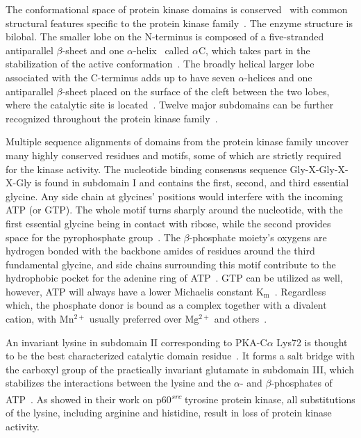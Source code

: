   The conformational space of protein kinase domains is conserved~\cite{ung2018redefining}
  with common structural features specific to the protein kinase
  family~\cite{taylor1994three}.
  The enzyme structure is bilobal.
  The smaller lobe on the N-terminus is composed of a five-stranded antiparallel
  $\beta$-sheet and one $\alpha$-helix~\cite{knighton1991crystal} called $\alpha$C, which
  takes part in the stabilization of the active
  conformation~\cite{mobitz2015abc, huse2002conformational}.
  The broadly helical larger lobe associated with the C-terminus adds up to have seven
  $\alpha$-helices and one antiparallel $\beta$-sheet placed on the surface of the cleft
  between the two lobes, where the catalytic site is
  located~\cite{knighton1991crystal, taylor1994three, azam2008activation}.
  Twelve major subdomains can be further recognized throughout the protein kinase
  family~\cite{hanks1988protein, hanks19912, hanks1995eukaryotic}.

  Multiple sequence alignments of domains from the protein kinase family uncover many
  highly conserved residues and motifs, some of which are strictly required for the kinase
  activity.
  The nucleotide binding consensus sequence Gly-X-Gly-X-X-Gly is found in subdomain I and
  contains the first, second, and third essential glycine.
  Any side chain at glycines' positions would interfere with the incoming ATP (or GTP).
  The whole motif turns sharply around the nucleotide, with the first essential glycine
  being in contact with ribose, while the second provides space for the pyrophosphate
  group~\cite{wierenga1983predicted, hanks1988protein}.
  The $\beta$-phosphate moiety's oxygens are hydrogen bonded with the backbone amides of
  residues around the third fundamental glycine, and side chains surrounding this motif
  contribute to the hydrophobic pocket for the adenine ring of
  ATP~\cite{hanks1995eukaryotic}.
  GTP can be utilized as well, however, ATP will always have a lower Michaelis constant
  $\mathrm{K_{m}}$~\cite{hunter1985protein}.
  Regardless which, the phosphate donor is bound as a complex together with a divalent
  cation, with $\mathrm{Mn^{2+}}$ usually preferred over $\mathrm{Mg^{2+}}$ and
  others~\cite{witte1980abelson, richert1979characterization, wong1984purification}.

  An invariant lysine in subdomain II corresponding to PKA-C$\alpha$ Lys72 is thought to
  be the best characterized catalytic domain residue~\cite{hanks1988protein}.
  It forms a salt bridge with the carboxyl group of the practically invariant glutamate in
  subdomain III, which stabilizes the interactions between the lysine and the $\alpha$-
  and $\beta$-phosphates of ATP~\cite{hanks1995eukaryotic}.
  As \citet{kamps1986neither} showed in their work on p60\textsuperscript{\textit{src}}
  tyrosine protein kinase, all substitutions of the lysine, including arginine and
  histidine, result in loss of protein kinase activity.

